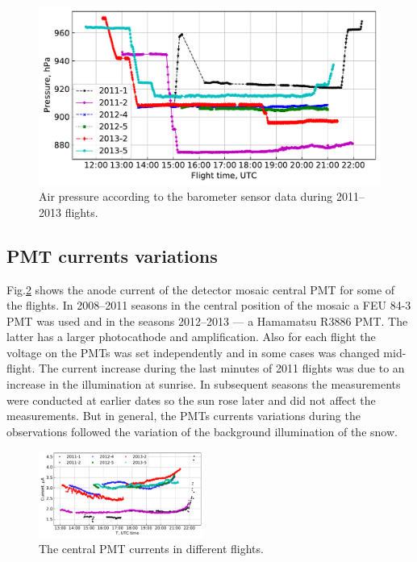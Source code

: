 \documentclass[preprint,5p,times]{elsarticle}
\begin{document}
\begin{figure}[tb]
    \includegraphics[width=.48\textwidth]{Telemetry_pressure.pdf}
    \caption{Air pressure according to the barometer sensor data during 2011--2013 flights.}
    \label{fig:pressure}
\end{figure}


\subsection{PMT currents variations}

 Fig.\ref{fig:current} shows the anode current of the detector mosaic central PMT for some of the flights. In 2008--2011 seasons in the central position of the mosaic a FEU 84-3 PMT was used and in the seasons 2012--2013 --- a Hamamatsu R3886 PMT. The latter has a larger photocathode and amplification. Also for each flight the voltage on the PMTs was set independently and in some cases was changed mid-flight. The current increase during the last minutes of 2011 flights was due to an increase in the illumination at sunrise. In subsequent seasons the measurements were conducted at earlier dates so the sun rose later and did not affect the measurements. But in general, the PMTs currents variations during the observations followed the variation of the background illumination of the snow.

\begin{figure}[tb]
    \includegraphics[width=0.48\textwidth]{hv-53.pdf}
    \caption{The central PMT currents in different flights.}
\label{fig:current}
\end{figure}
\end{document}
